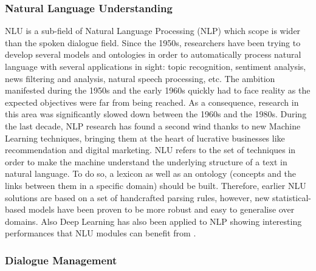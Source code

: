                         \subsubsection{Natural Language Understanding}
                        
                        NLU is a sub-field of Natural Language Processing (NLP) which scope is wider than the spoken dialogue field. Since the 1950s, researchers have been trying to develop several models and ontologies in order to automatically process natural language with several applications in sight: topic recognition, sentiment analysis, news filtering and analysis, natural speech processing, etc. The ambition manifested during the 1950s and the early 1960s quickly had to face reality as the expected objectives were far from being reached. As a consequence, research in this area was significantly slowed down between the 1960s and the 1980s. During the last decade, NLP research has found a second wind thanks to new Machine Learning techniques, bringing them at the heart of lucrative businesses like recommendation and digital marketing. NLU refers to the set of techniques in order to make the machine understand the underlying structure of a text in natural language. To do so, a lexicon as well as an ontology (concepts and the links between them in a specific domain) should be built. Therefore, earlier NLU solutions are based on a set of handcrafted parsing rules, however, new statistical-based models \cite{Macherey2009} have been proven to be more robust and easy to generalise over domains. Also Deep Learning has also been applied to NLP showing interesting performances that NLU modules can benefit from \cite{Bengio2003,Collobert2011}.

                        \subsubsection{Dialogue Management}
                        
